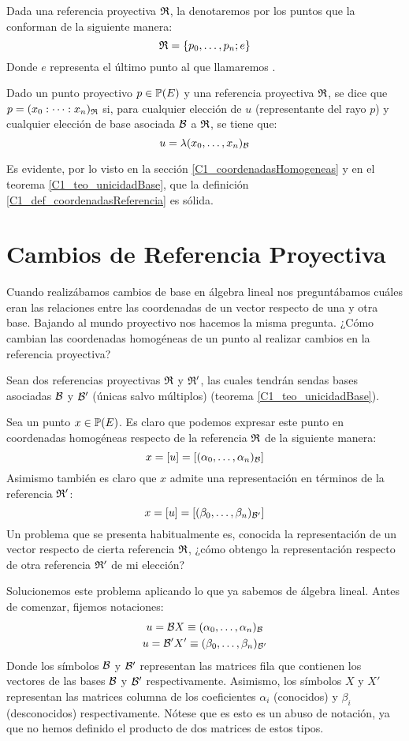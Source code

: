 Dada una referencia proyectiva $\mathfrak{R}$, la denotaremos por los puntos que la conforman de la siguiente manera:
\begin{equation}
\label{C1_eq_notacionReferencias}
\mathfrak{R}=\{p_0,\dots,p_n;e\}
\end{equation}
Donde $e$ representa el último punto al que llamaremos .
\begin{defi}
	\label{C1_def_coordenadasReferencia}
	Dado un punto proyectivo $p\in\mathbb{P}(E)$ y una referencia proyectiva $\mathfrak{R}$, se dice que $p=(x_0:\dots :x_n)_{\mathfrak{R}}$ si, para cualquier elección de $u$ (representante del rayo $p$) y cualquier elección de base asociada $\mathcal{B}$ a $\mathfrak{R}$, se tiene que:
	\[u=\lambda(x_0,\dots,x_n)_{\mathcal{B}}\]
\end{defi}
Es evidente, por lo visto en la sección \ref{C1_coordenadasHomogeneas} y en el teorema \ref{C1_teo_unicidadBase}, que la definición \ref{C1_def_coordenadasReferencia} es sólida.
\section{Cambios de Referencia Proyectiva}
Cuando realizábamos cambios de base en álgebra lineal nos preguntábamos cuáles eran las relaciones entre las coordenadas de un vector respecto de una y otra base. Bajando al mundo proyectivo nos hacemos la misma pregunta. ¿Cómo cambian las coordenadas homogéneas de un punto al realizar cambios en la referencia proyectiva?

Sean dos referencias proyectivas $\mathfrak{R}$ y $\mathfrak{R}'$, las cuales tendrán sendas bases asociadas $\mathcal{B}$ y $\mathcal{B}'$ (únicas salvo múltiplos) (teorema \ref{C1_teo_unicidadBase}).

Sea un punto $x\in\mathbb{P}(E)$. Es claro que podemos expresar este punto en coordenadas homogéneas respecto de la referencia $\mathfrak{R}$ de la siguiente manera:
\[x=\left [ u \right ]=\left [ (\alpha_0,\dots,\alpha_n)_{\mathcal{B}} \right ]\]
Asimismo también es claro que $x$ admite una representación en términos de la referencia $\mathfrak{R}'$:
\[x=\left [ u \right ]=\left [ (\beta_0,\dots,\beta_n)_{\mathcal{B}'} \right ]\]
Un problema que se presenta habitualmente es, conocida la representación de un vector respecto de cierta referencia $\mathfrak{R}$, ¿cómo obtengo la representación respecto de otra referencia $\mathfrak{R}'$ de mi elección?

Solucionemos este problema aplicando lo que ya sabemos de álgebra lineal. Antes de comenzar, fijemos notaciones:
\begin{gather*}
	u=\mathcal{B}X\equiv(\alpha_0,\dots,\alpha_n)_{\mathcal{B}}\\
	u=\mathcal{B}'X'\equiv(\beta_0,\dots,\beta_n)_{\mathcal{B}'}
\end{gather*}
Donde los símbolos $\mathcal{B}$ y $\mathcal{B}'$ representan las matrices fila que contienen los vectores de las bases $\mathcal{B}$ y $\mathcal{B}'$ respectivamente. Asimismo, los símbolos $X$ y $X'$ representan las matrices columna de los coeficientes $\alpha_i$ (conocidos) y $\beta_i$ (desconocidos) respectivamente. Nótese que es esto es un abuso de notación, ya que no hemos definido el producto de dos matrices de estos tipos.

